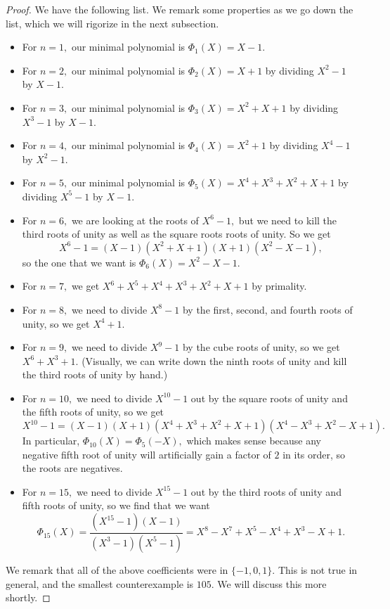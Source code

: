 \begin{proof}
	We have the following list. We remark some properties as we go down the list, which we will rigorize in the next subsection.
	\begin{itemize}
		\item For $n=1,$ our minimal polynomial is $\Phi_1(X)=X-1.$
		\item For $n=2,$ our minimal polynomial is $\Phi_2(X)=X+1$ by dividing $X^2-1$ by $X-1.$
		\item For $n=3,$ our minimal polynomial is $\Phi_3(X)=X^2+X+1$ by dividing $X^3-1$ by $X-1.$
		\item For $n=4,$ our minimal polynomial is $\Phi_4(X)=X^2+1$ by dividing $X^4-1$ by $X^2-1.$
		\item For $n=5,$ our minimal polynomial is $\Phi_5(X)=X^4+X^3+X^2+X+1$ by dividing $X^5-1$ by $X-1.$ 
		\item For $n=6,$ we are looking at the roots of $X^6-1,$ but we need to kill the third roots of unity as well as the square roots roots of unity. So we get
		\[X^6-1=(X-1)\left(X^2+X+1\right)\left(X+1\right)\left(X^2-X-1\right),\]
		so the one that we want is $\Phi_6(X)=X^2-X-1.$
		\item For $n=7,$ we get $X^6+X^5+X^4+X^3+X^2+X+1$ by primality.
		\item For $n=8,$ we need to divide $X^8-1$ by the first, second, and fourth roots of unity, so we get $X^4+1.$
		\item For $n=9,$ we need to divide $X^9-1$ by the cube roots of unity, so we get $X^6+X^3+1.$ (Visually, we can write down the ninth roots of unity and kill the third roots of unity by hand.)
		\item For $n=10,$ we need to divide $X^{10}-1$ out by the square roots of unity and the fifth roots of unity, so we get
		\[X^{10}-1=(X-1)(X+1)\left(X^4+X^3+X^2+X+1\right)\left(X^4-X^3+X^2-X+1\right).\]
		In particular, $\Phi_{10}(X)=\Phi_5(-X),$ which makes sense because any negative fifth root of unity will artificially gain a factor of $2$ in its order, so the roots are negatives.
		\item For $n=15,$ we need to divide $X^{15}-1$ out by the third roots of unity and fifth roots of unity, so we find that we want
		\[\Phi_{15}(X)=\frac{\left(X^{15}-1\right)\left(X-1\right)}{\left(X^3-1\right)\left(X^5-1\right)}=X^8-X^7+X^5-X^4+X^3-X+1.\]
	\end{itemize}
	We remark that all of the above coefficients were in $\{-1,0,1\}.$ This is not true in general, and the smallest counterexample is $105.$ We will discuss this more shortly.
\end{proof}

